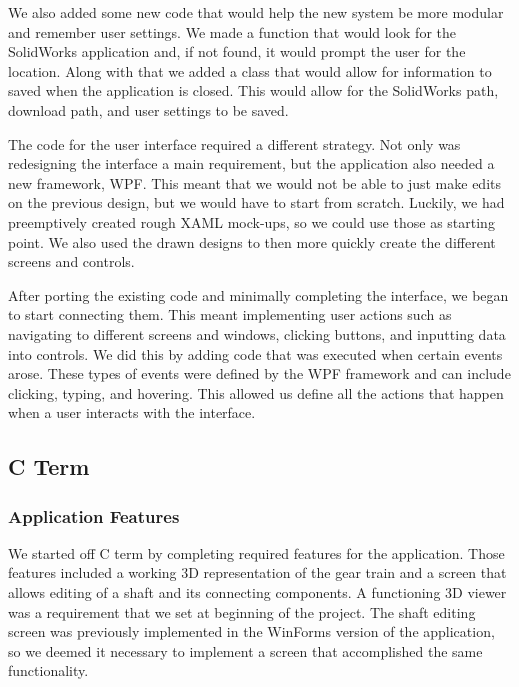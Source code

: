 \begin{doublespace}
We also added some new code that would help the new system be more modular and remember user settings. We made a function that would look for the SolidWorks application and, if not found, it would prompt the user for the location. Along with that we added a class that would allow for information to saved when the application is closed. This would allow for the SolidWorks path, download path, and user settings to be saved.

The code for the user interface required a different strategy. Not only was redesigning the interface a main requirement, but the application also needed a new framework, WPF. This meant that we would not be able to just make edits on the previous design, but we would have to start from scratch. Luckily, we had preemptively created rough XAML mock-ups, so we could use those as starting point. We also used the drawn designs to then more quickly create the different screens and controls.

After porting the existing code and minimally completing the interface, we began to start connecting them. This meant implementing user actions such as navigating to different screens and windows, clicking buttons, and inputting data into controls. We did this by adding code that was executed when certain events arose. These types of events were defined by the WPF framework and can include clicking, typing, and hovering.  This allowed us define all the actions that happen when a user interacts with the interface.

\subsection{C Term}
\subsubsection{Application Features}

We started off C term by completing required features for the application. Those features included a working 3D representation of the gear train and a screen that allows editing of a shaft and its connecting components. A functioning 3D viewer was a requirement that we set at beginning of the project. The shaft editing screen was previously implemented in the WinForms version of the application, so we deemed it necessary to implement a screen that accomplished the same functionality.


\end{doublespace}
